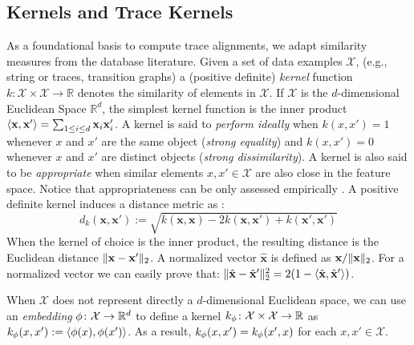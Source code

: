 \subsection{Kernels and Trace Kernels}\label{subsec:katk}
As a foundational basis to compute trace alignments, we adapt similarity measures from the database literature.  Given a set of data examples $\mathcal{X}$, (e.g., string or traces, transition graphs) a (positive definite) \emph{kernel} function $k\colon \mathcal{X}\times \mathcal{X}\to \mathbb{R}$ denotes the similarity of elements in $\mathcal{X}$. If $\mathcal{X}$ is the $d$-dimensional Euclidean Space $\mathbb{R}^d$, the simplest kernel function is the inner product $\Braket{\mathbf{x},\mathbf{x}'}=\sum_{1\leq i\leq d}\mathbf{x}_i\mathbf{x}'_i$.
A kernel is said to \emph{perform ideally} \cite{Gartner03} when $k(x,x')=1$ whenever $x$ and $x'$ are the same object (\textit{strong equality}) and $k(x,x')=0$ whenever $x$ and $x'$ are distinct objects (\textit{strong dissimilarity}). A kernel is also said to be \emph{appropriate} when similar elements $x,x'\in\mathcal{X}$ are also close in the feature space. Notice that appropriateness can be only assessed  empirically \cite{Gartner03}.
A positive definite kernel induces a distance metric as \cite{Raedt}:
\begin{equation}\label{eq:dofk}
d_k(\mathbf{x},\mathbf{x}'):=\sqrt{k(\mathbf{x},\mathbf{x})-2k(\mathbf{x},\mathbf{x}')+k(\mathbf{x}',\mathbf{x}')}
\end{equation}
When the kernel of choice is the inner product, the resulting distance is the Euclidean distance $\|\mathbf{x}-\mathbf{x}'\|_{2}$. A normalized vector $\hat{\mathbf{x}}$ is defined as $\mathbf{x}/\|\mathbf{x}\|_{2}$. For a normalized vector we can easily prove that: $\|\hat{\mathbf{x}}-\hat{\mathbf{x}}'\|_{2}^2=2(1-\Braket{\hat{\mathbf{x}},\hat{\mathbf{x}}'})$.

When $\mathcal{X}$ does not represent directly a $d$-dimensional Euclidean space, we can use an \emph{embedding} $\phi\colon\mathcal{X}\to \mathbb{R}^d$ to define a kernel $k_\phi\colon \mathcal{X}\times \mathcal{X}\to\mathbb{R}$ as $k_\phi(x,x'):=\Braket{\phi(x),\phi(x')}$. As a result, $k_\phi(x,x')=k_\phi(x',x)$ for each $x,x'\in\mathcal{X}$.

